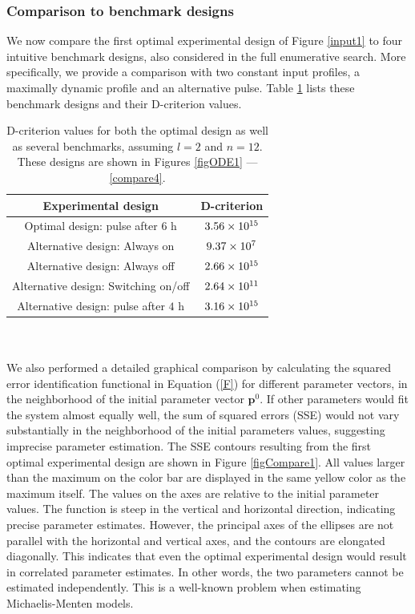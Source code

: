 \subsubsection{Comparison to benchmark designs}
We now compare the first optimal experimental design of Figure \ref{input1} to four intuitive benchmark designs, also considered in the full enumerative search. More specifically, we provide a comparison with two constant input profiles, a maximally dynamic profile and an alternative pulse. Table \ref{table1} lists these benchmark designs and their D-criterion values.
\begin{table}
	\centering
	\begin{tabular}{|c|c|}
		\hline 
		Experimental design & D-criterion \\ 
		\hline 
		Optimal design: pulse after $6 \text{ h}$& $3.56\times 10^{15}$  \\ 
		
		Alternative design: Always on & $9.37\times 10^{7}$ \\ 
		
		Alternative design: Always off & $2.66\times 10^{15}$ \\ 
		
		Alternative design: Switching on/off & $2.64\times 10^{11}$ \\ 
		
		Alternative design: pulse after $4 \text{ h}$ & 
		$3.16\times 10^{15}$ \\ 
		\hline
	\end{tabular} 
	\caption{D-criterion values for both the optimal design as well as several benchmarks, assuming $l=2$ and $n=12$. {\color{red}These designs are shown in Figures \ref{figODE1} --- \ref{compare4}.}} 
	\label{table1}
\end{table}
\\
\\
We also performed a detailed graphical comparison by calculating the squared error identification functional in Equation (\ref{F}) for different parameter vectors, in the neighborhood of the initial parameter vector $\mathbf{p}^0$. If other parameters would fit the system almost equally well, the sum of squared errors (SSE) would not vary substantially in the neighborhood of the initial parameters values, suggesting imprecise parameter estimation. The SSE contours resulting from the first optimal experimental design are shown in Figure \ref{figCompare1}. All values larger than the maximum on the color bar are displayed in the same yellow color as the maximum itself. The values on the axes are relative to the initial parameter values. The function is steep in the vertical and horizontal direction, indicating precise parameter estimates. However, the principal axes of the ellipses are not parallel with the horizontal and vertical axes, and the contours are elongated diagonally. This indicates that even the optimal experimental design would result in correlated parameter estimates. In other words, the two parameters cannot be estimated independently. This is a well-known problem when estimating Michaelis-Menten models.
